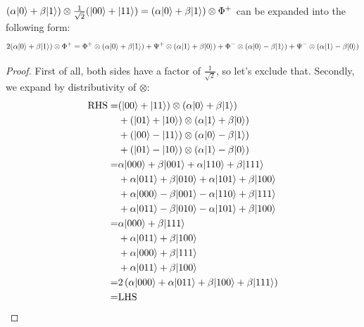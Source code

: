 \documentclass[12pt]{article}
\begin{document}
\begin{lemma}
$(\alpha \Ket{0} + \beta \Ket{1})\otimes \frac{1}{\sqrt{2}}(\Ket{00} + \Ket{11}) = (\alpha \Ket{0} + \beta \Ket{1})\otimes \Phi^+$ can be expanded into the following form: $$
2(\alpha \Ket{0} + \beta \Ket{1})\otimes \Phi^+ = \Phi^+\otimes(\alpha\Ket{0} + \beta\Ket{1}) + \Psi^+\otimes(\alpha\Ket{1} + \beta\Ket{0}) + \Phi^-\otimes(\alpha\Ket{0} - \beta\Ket{1}) + \Psi^-\otimes(\alpha\Ket{1} - \beta\Ket{0})
$$
\end{lemma}
\begin{proof}
First of all, both sides have a factor of $\frac{1}{\sqrt{2}}$, so let's exclude that. Secondly, we expand by distributivity of $\otimes$:
$$
\begin{aligned}
\text{RHS}=
    &(\Ket{00} + \Ket{11})\otimes (\alpha\Ket{0} + \beta\Ket{1})\\
    &+(\Ket{01} + \Ket{10})\otimes (\alpha\Ket{1} + \beta\Ket{0})\\
    &+(\Ket{00} - \Ket{11})\otimes (\alpha\Ket{0} - \beta\Ket{1})\\
    &+(\Ket{01} - \Ket{10})\otimes (\alpha\Ket{1} - \beta\Ket{0})\\
    =
    &\alpha\Ket{000} + \beta\Ket{001} +  \alpha\Ket{110} +  \beta\Ket{111}\\
    &+  \alpha\Ket{011} +  \beta\Ket{010} + \alpha\Ket{101} + \beta\Ket{100}\\
    &+ \alpha\Ket{000} - \beta\Ket{001} -  \alpha\Ket{110} +  \beta\Ket{111}\\
    &+  \alpha\Ket{011} -  \beta\Ket{010} - \alpha\Ket{101} + \beta\Ket{100}\\
    =
    &\alpha\Ket{000} + \beta\Ket{111}\\
    &+ \alpha\Ket{011} + \beta\Ket{100}\\
    &+ \alpha\Ket{000} + \beta\Ket{111}\\
    &+ \alpha\Ket{011} + \beta\Ket{100}\\
    =
    &2\prt{\alpha\Ket{000} + \alpha\Ket{011} + \beta\Ket{100} + \beta\Ket{111}}\\
    =
    &\text{LHS}
\end{aligned}
$$
\end{proof}
\end{document}
